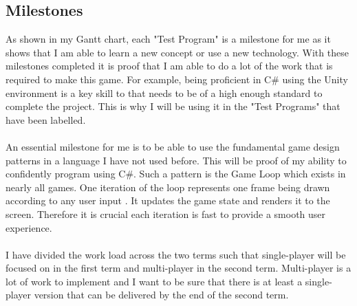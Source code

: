 \documentclass[a4paper]{report}
\begin{document}
\newpage
\subsection{Milestones}
As shown in my Gantt chart, each "Test Program" is a milestone for me as it shows that I am able to learn a new concept or use a new technology. With these milestones completed it is proof that I am able to do a lot of the work that is required to make this game. For example, being proficient in C\# using the Unity environment is a key skill to that needs to be of a high enough standard to complete the project. This is why I will be using it in the "Test Programs" that have been labelled.
\\\\
An essential milestone for me is to be able to use the fundamental game design patterns in a language I have not used before. This will be proof of my ability to confidently program using C\#. Such a pattern is the Game Loop which exists in nearly all games. One iteration of the loop represents one frame being drawn according to any user input \cite{Loop}. It updates the game state and renders it to the screen. Therefore it is crucial each iteration is fast to provide a smooth user experience.
\\\\
I have divided the work load across the two terms such that single-player will be focused on in the first term and multi-player in the second term. Multi-player is a lot of work to implement and I want to be sure that there is at least a single-player version that can be delivered by the end of the second term. 
\end{document}
